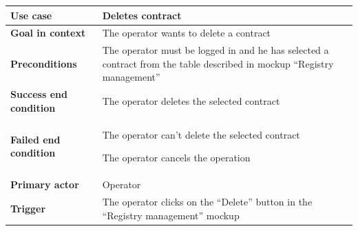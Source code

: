 {{{			\begin{center}
			\begin{tabular}{|p{4cm}|p{10cm}|}
			\hline
				\centering \vspace{1mm} \bfseries{Use case} \vspace{1mm} & 
				\vspace{1mm} Deletes contract \vspace{1mm}\\
			\hline
				\centering \vspace{1mm} \bfseries{Goal in context} \vspace{1mm} & 
				\vspace{1mm}The operator wants to delete a contract  \vspace{1mm}\\
			\hline
				\centering \vspace{1mm} \bfseries{Preconditions} \vspace{1mm} & 
				\vspace{1mm}The operator must be logged in and he has selected a contract from the table described in mockup “Registry management” \vspace{1mm}\\
			\hline
				\centering \vspace{1mm} \bfseries{Success end condition} \vspace{1mm} & 
				\vspace{1mm}The operator deletes the selected contract \vspace{1mm}\\
			\hline
				\centering \vspace{1mm} \bfseries{Failed end condition} \vspace{1mm} & 
				\vspace{1mm} The operator can’t delete the selected contract 

				The operator cancels the operation\vspace{1mm}\\
			\hline
				\centering \vspace{1mm} \bfseries{Primary actor} \vspace{1mm} & 
				\vspace{1mm} Operator \vspace{1mm}\\
			\hline
				\centering \vspace{1mm} \bfseries{Trigger} \vspace{1mm} & 
				\vspace{1mm} The operator clicks on the “Delete” button in the “Registry management” mockup\vspace{1mm}\\
			\hline
			\end{tabular}


\end{center}}}}
